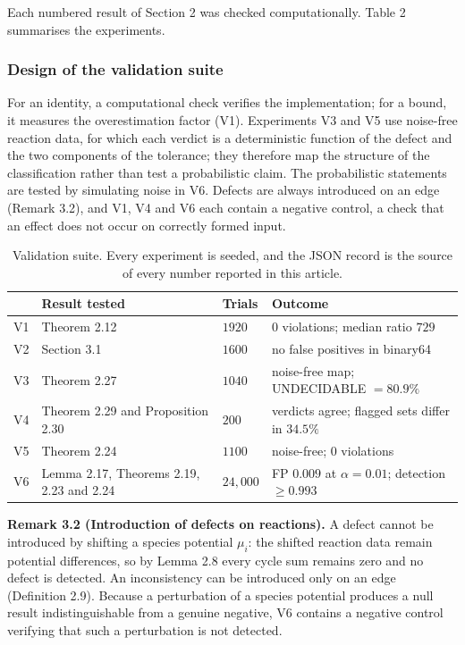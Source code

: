 \documentclass[11pt,a4paper]{article}
\theoremstyle{pstyle}
\theoremstyle{definition}
\theoremstyle{remark}
\begin{document}
Each numbered result of Section 2 was checked computationally.
Table 2 summarises the experiments.

\subsubsection{Design of the validation suite}

For an identity, a computational check verifies the implementation; for
a bound, it measures the overestimation factor (V1). Experiments V3 and
V5 use noise-free reaction data, for which each verdict is a
deterministic function of the defect and the two components of the
tolerance; they therefore map the structure of the classification
rather than test a probabilistic claim. The probabilistic statements are
tested by simulating noise in V6. Defects are always introduced on an
edge (Remark 3.2), and V1, V4 and V6 each contain a
negative control, a check that an effect does not occur on correctly
formed input.

\begin{table}[t]
\centering\small
\caption{Validation suite. Every experiment is seeded, and the JSON
record is the source of every number reported in this article.}
\label{tab:validation}
\begin{tabular}{@{}llll@{}}
\toprule
& Result tested & Trials & Outcome\\
\midrule
V1 & Theorem 2.12 & $1920$ & $0$ violations; median ratio $729$\\
V2 & Section 3.1 & $1600$ & no false positives in binary64\\
V3 & Theorem 2.27 & $1040$ & noise-free map;
\textsf{UNDECIDABLE} $=80.9\%$\\
V4 & Theorem 2.29 and Proposition 2.30 & $200$ &
verdicts agree; flagged sets differ in $34.5\%$\\
V5 & Theorem 2.24 & $1100$ & noise-free; $0$ violations\\
V6 & Lemma 2.17, Theorems 2.19, 2.23 and 2.24 & $24{,}000$ &
FP $0.009$ at $\alpha=0.01$; detection $\ge0.993$\\
\bottomrule
\end{tabular}
\end{table}

\par\noindent\textbf{Remark 3.2 (Introduction of defects on reactions).}\label{rem:edge-not-node} 
A defect cannot be introduced by shifting a species potential $\mu_i$:
the shifted reaction data remain potential differences, so by
Lemma 2.8 every cycle sum remains zero and no defect is
detected. An inconsistency can be introduced only on an edge
(Definition 2.9). Because a perturbation of a species potential
produces a null result indistinguishable from a genuine negative, V6
contains a negative control verifying that such a perturbation is not
detected.
\par
\end{document}
